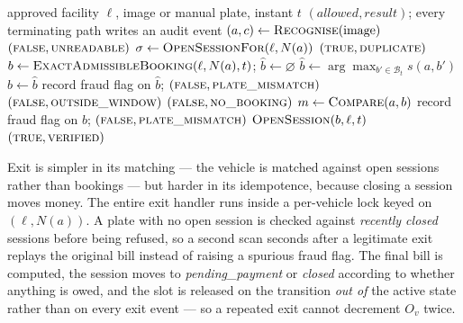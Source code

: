 \documentclass[journal,onecolumn,11pt]{IEEEtran}
\begin{document}
\begin{algorithm}[!t]
\caption{Entry gate decision}
\label{alg:entry}
\small
\begin{algorithmic}[1]
\Require approved facility $\ell$, image or manual plate, instant $t$
\Ensure $(\textit{allowed}, \textit{result})$; every terminating path writes an audit event
\State $(a, c) \gets \Call{Recognise}{\text{image}}$
  \State \Return $(\textsc{false}, \textsc{unreadable})$
\EndIf
\State $\sigma \gets \Call{OpenSessionFor}{\ell, N(a)}$
\If{$\sigma \neq \varnothing$}
  \State \Return $(\textsc{true}, \textsc{duplicate})$
\EndIf
\State $b \gets \Call{ExactAdmissibleBooking}{\ell, N(a), t}$;\quad
       $\hat{b} \gets \varnothing$
  \State $\hat{b} \gets \arg\max_{b' \in \mathcal{B}_t} s(a, b')$
    \State $b \gets \hat{b}$ 
  \EndIf
\EndIf
{}
    \State record fraud flag on $\hat{b}$;\quad
      \Return $(\textsc{false}, \textsc{plate\_mismatch})$
  \EndIf
    \State \Return $(\textsc{false}, \textsc{outside\_window})$
  \EndIf
  \State \Return $(\textsc{false}, \textsc{no\_booking})$
\EndIf
\State $m \gets \Call{Compare}{a, b}$
  \State record fraud flag on $b$;\quad
    \Return $(\textsc{false}, \textsc{plate\_mismatch})$
\EndIf
\State $\Call{OpenSession}{b, \ell, t}$
\State \Return $(\textsc{true}, \textsc{verified})$
\end{algorithmic}
\end{algorithm}

Exit is simpler in its matching --- the vehicle is matched against open sessions
rather than bookings --- but harder in its idempotence, because closing a
session moves money. The entire exit handler runs inside a per-vehicle lock
keyed on $(\ell, N(a))$. A plate with no open session is checked against
\emph{recently closed} sessions before being refused, so a second scan seconds
after a legitimate exit replays the original bill instead of raising a spurious
fraud flag. The final bill is computed, the session moves to
\textit{pending\_payment} or \textit{closed} according to whether anything is
owed, and the slot is released on the transition \emph{out of} the active state
rather than on every exit event --- so a repeated exit cannot decrement $O_v$
twice.
\end{document}
